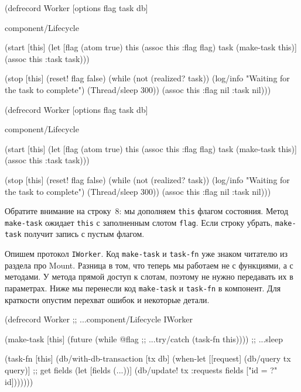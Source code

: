 \ifx\DEVICETYPE\MOBILE

\begin{english}
  \begin{clojure/lines}
(defrecord Worker
  [options flag task db]

  component/Lifecycle

  (start [this]
    (let [flag (atom true)
          this (assoc this :flag flag)
          task (make-task this)]
      (assoc this :task task)))

  (stop [this]
    (reset! flag false)
    (while (not (realized? task))
      (log/info
        "Waiting for
             the task to complete")
      (Thread/sleep 300))
    (assoc this :flag nil :task nil)))
  \end{clojure/lines}
\end{english}

\else

\begin{english}
  \begin{clojure/lines}
(defrecord Worker
  [options flag task db]

  component/Lifecycle

  (start [this]
    (let [flag (atom true)
          this (assoc this :flag flag)
          task (make-task this)]
      (assoc this :task task)))

  (stop [this]
    (reset! flag false)
    (while (not (realized? task))
      (log/info "Waiting for the task to complete")
      (Thread/sleep 300))
    (assoc this :flag nil :task nil)))
  \end{clojure/lines}
\end{english}

\fi

Обратите внимание на строку~8: мы дополняем \verb|this| флагом
состояния. Метод \verb|make-task| ожидает \verb|this| с заполненным слотом
\verb|flag|. Если строку убрать, \verb|make-task| получит запись с пустым
флагом.


Опишем протокол \verb|IWorker|. Код \verb|make-task| и \verb|task-fn| уже
знаком читателю из раздела про Mount. Разница в том, что теперь мы работаем не с
функциями, а с методами. У метода прямой доступ к слотам, поэтому не нужно
передавать их в параметрах. Ниже мы перенесли код \verb|make-task| и
\verb|task-fn| в компонент. Для краткости опустим перехват ошибок и некоторые
детали.

\ifx\DEVICETYPE\MOBILE

\begin{english}
  \begin{clojure}
(defrecord Worker
  ;; ...component/Lifecycle
  IWorker

  (make-task [this]
    (future
      (while @flag    ;; ...try/catch
        (task-fn this)))) ;; ...sleep

  (task-fn [this]
    (db/with-db-transaction [tx db]
      (when-let [[request]
                 (db/query tx query)]
        ;; get fields
        (let [fields (...))]
          (db/update! tx :requests
            fields ["id = ?" id]))))))
  \end{clojure}
\end{english}

